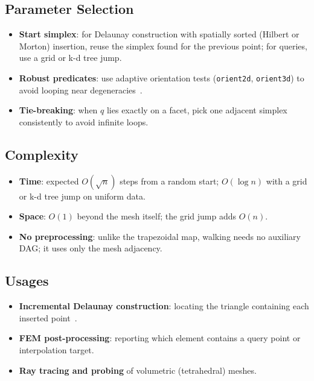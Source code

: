 \subsection{Parameter Selection}
\begin{itemize}
\item \textbf{Start simplex}: for Delaunay construction with spatially sorted
  (Hilbert or Morton) insertion, reuse the simplex found for the previous
  point; for queries, use a grid or k-d tree jump.
\item \textbf{Robust predicates}: use adaptive orientation tests
  (\texttt{orient2d}, \texttt{orient3d}) to avoid looping near
  degeneracies~\cite{shewchuk1997}.
\item \textbf{Tie-breaking}: when $q$ lies exactly on a facet, pick one
  adjacent simplex consistently to avoid infinite loops.
\end{itemize}

\subsection{Complexity}
\begin{itemize}
\item \textbf{Time}: expected $O(\sqrt{n})$ steps from a random start;
  $O(\log n)$ with a grid or k-d tree jump on uniform data.
\item \textbf{Space}: $O(1)$ beyond the mesh itself; the grid jump adds
  $O(n)$.
\item \textbf{No preprocessing}: unlike the trapezoidal map, walking needs no
  auxiliary DAG; it uses only the mesh adjacency.
\end{itemize}

\subsection{Usages}
\begin{itemize}
\item \textbf{Incremental Delaunay construction}: locating the triangle
  containing each inserted point~\cite{bowyer1981,watson1981}.
\item \textbf{FEM post-processing}: reporting which element contains a query
  point or interpolation target.
\item \textbf{Ray tracing and probing} of volumetric (tetrahedral) meshes.
\end{itemize}


